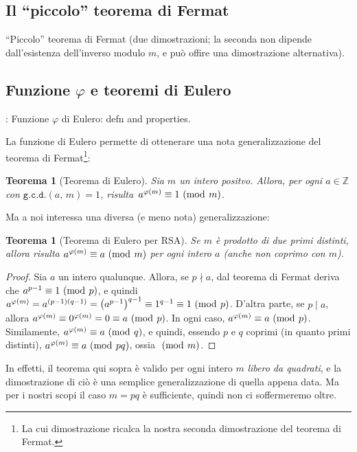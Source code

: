 \documentclass[pdflatex,11pt,a4paper,oneside]{article}
\renewcommand{\phi}{\varphi}
\newcommand{\XXX}[1][XXX]{\text{\bfseries{\color{red}{\emph{#1}}}}}
\newcommand{\TODO}[0]{\XXX[TODO]}
\newcommand{\p}[1]{\left({#1}\right)}
\newcommand{\Z}[0]{\mathbb{Z}}
\newcommand{\divides}[0]{\mid}
\newcommand{\notdivides}[0]{\nmid}
\newcommand{\congruent}[0]{\equiv}
\newcommand{\mmodop}[0]{\ensuremath{\operatorname{mod}}}
\newcommand{\mmod}[1]{\ensuremath{\allowbreak\ (\mmodop\:{#1})}}
\newcommand{\gcdop}[0]{\ensuremath{\mathtt{g.c.d.}}}
\newcommand{\xgcd}[1]{\ensuremath{\gcdop\left({#1}\right)}}
\renewcommand{\gcd}[2]{\xgcd{{#1},\,{#2}}}
\newtheorem{theorem}[TheoremLike]{Teorema}
\begin{document}
\subsection{Il ``piccolo'' teorema di Fermat}

``Piccolo'' teorema di Fermat (due dimostrazioni; la seconda non dipende
dall'esistenza dell'inverso modulo $m$, e pu\`o offire una dimostrazione
alternativa).


\subsection{Funzione $\phi$ e teoremi di Eulero}

\TODO: Funzione $\phi$ di Eulero: defn and properties.

La funzione di Eulero permette di ottenerare una nota generalizzazione
del teorema di Fermat\footnote{La cui dimostrazione ricalca la nostra
seconda dimostrazione del teorema di Fermat.}:

\begin{theorem}[Teorema di Eulero]\label{thm:euler}
  Sia $m$ un intero positvo. Allora, per ogni $a \in \Z$ con
  $\gcd{a}{m} = 1$, risulta\, $a^{\phi(m)} \congruent 1 \mmod m$.
\end{theorem}

\noindent
Ma a noi interessa una diversa (e meno nota) generalizzazione:

\begin{theorem}[Teorema di Eulero per RSA]\label{thm:euler-rsa}
Se $m$ \`e prodotto di due primi \emph{distinti}, allora risulta
$a^{\phi(m)} \congruent a \mmod m$ per \emph{ogni} intero $a$ (anche
non coprimo con $m$).
\end{theorem}
%
\begin{proof}
Sia $a$ un intero qualunque.  Allora, se $p \notdivides a$, dal teorema
di Fermat deriva che $a^{p-1} \congruent 1 \mmod p$, e quindi
$a^{\phi(m)} = a^{(p-1)(q-1)} = {\p{a^{p-1}}}^{q-1} \congruent 1^{q-1}
\congruent 1 \mmod p$.  D'altra parte, se $p \divides a$, allora
$a^{\phi(m)} \congruent 0^{\phi(m)} = 0 \congruent a \mmod p$.  In ogni
caso, $a^{\phi(m)} \congruent a \mmod p$.  Similamente, $a^{\phi(m)}
\congruent a \mmod q$, e quindi, essendo $p$ e $q$ coprimi (in quanto
primi distinti), $a^{\phi(m)} \congruent a \mmod{pq}$, ossia $\mmod m$.
\end{proof}

In effetti, il teorema qui sopra \`e valido per ogni intero $m$
\emph{libero da quadrati}, e la dimostrazione di ci\`o \`e una
semplice generalizzazione di quella appena data.  Ma per i nostri
scopi il caso $m = pq$ \`e sufficiente, quindi non ci soffermeremo
oltre.
\end{document}
